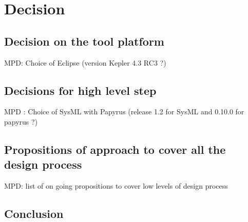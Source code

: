 \chapter{Decision}
\label{sec:decision}


\section{Decision on the tool platform}


\begin{todo_comment}
MPD: Choice of Eclipse (version Kepler 4.3 RC3 ?)
\end{todo_comment}


\section{Decisions for high level step}


\begin{todo_comment}
MPD :  Choice of SysML with Papyrus (release 1.2 for SysML and 0.10.0 for papyrus ?)
\end{todo_comment}

\section{Propositions of approach to cover all the design process}


\begin{todo_comment}
MPD: list of on going propositions to  cover low levels of design process
\end{todo_comment}

\section{Conclusion}